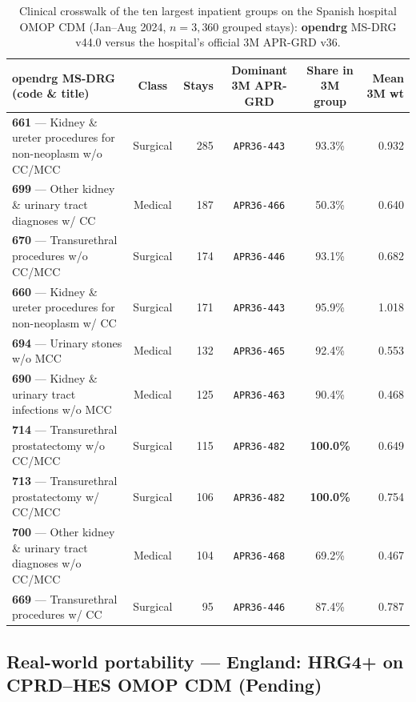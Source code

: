\documentclass[fleqn,10pt]{IOMEDArticle}
\begin{document}
\begin{table}[!t]\centering
\caption{Clinical crosswalk of the ten largest inpatient groups on the Spanish hospital OMOP CDM (Jan--Aug 2024, $n = 3{,}360$ grouped stays): \textbf{opendrg} MS-DRG v44.0 versus the hospital's official 3M APR-GRD v36.}
\label{tab:omop_xwalk}
\scriptsize
\setlength{\tabcolsep}{4.5pt}
\begin{tabular}{@{}p{7.4cm}crccr@{}}
\toprule
\textbf{opendrg} MS-DRG (code \& title) & Class & Stays & Dominant 3M APR-GRD & Share in 3M group & Mean 3M wt \\
\midrule
\textbf{661} — Kidney \& ureter procedures for non-neoplasm w/o CC/MCC & Surgical & 285 & \texttt{APR36-443} & 93.3\% & 0.932 \\
\textbf{699} — Other kidney \& urinary tract diagnoses w/ CC & Medical & 187 & \texttt{APR36-466} & 50.3\% & 0.640 \\
\textbf{670} — Transurethral procedures w/o CC/MCC & Surgical & 174 & \texttt{APR36-446} & 93.1\% & 0.682 \\
\textbf{660} — Kidney \& ureter procedures for non-neoplasm w/ CC & Surgical & 171 & \texttt{APR36-443} & 95.9\% & 1.018 \\
\textbf{694} — Urinary stones w/o MCC & Medical & 132 & \texttt{APR36-465} & 92.4\% & 0.553 \\
\textbf{690} — Kidney \& urinary tract infections w/o MCC & Medical & 125 & \texttt{APR36-463} & 90.4\% & 0.468 \\
\textbf{714} — Transurethral prostatectomy w/o CC/MCC & Surgical & 115 & \texttt{APR36-482} & \textbf{100.0\%} & 0.649 \\
\textbf{713} — Transurethral prostatectomy w/ CC/MCC & Surgical & 106 & \texttt{APR36-482} & \textbf{100.0\%} & 0.754 \\
\textbf{700} — Other kidney \& urinary tract diagnoses w/o CC/MCC & Medical & 104 & \texttt{APR36-468} & 69.2\% & 0.467 \\
\textbf{669} — Transurethral procedures w/ CC & Surgical & 95 & \texttt{APR36-446} & 87.4\% & 0.787 \\
\bottomrule
\end{tabular}
\end{table}

\subsection{Real-world portability — England: HRG4+ on CPRD--HES OMOP CDM (Pending)}
\end{document}

